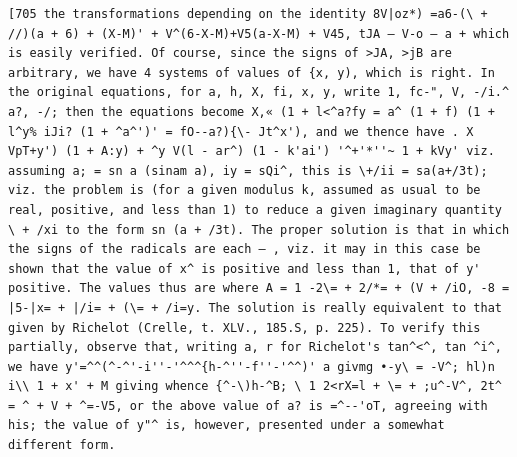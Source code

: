 \documentclass[11pt,a4paper]{book}
\begin{document}
\newpage
\setcounter{page}{584}
\begin{verbatim}
[705 the transformations depending on the identity 8V|oz*) =a6-(\ + //)(a + 6) + (X-M)' + V^(6-X-M)+V5(a-X-M) + V45, tJA — V-o — a + which is easily verified. Of course, since the signs of >JA, >jB are arbitrary, we have 4 systems of values of {x, y), which is right. In the original equations, for a, h, X, fi, x, y, write 1, fc-", V, -/i.^ a?, -/; then the equations become X,« (1 + l<^a?fy = a^ (1 + f) (1 + l^y% iJi? (1 + ^a^')' = fO--a?){\- Jt^x'), and we thence have . X VpT+y') (1 + A:y) + ^y V(l - ar^) (1 - k'ai') '^+'*''~ 1 + kVy' viz. assuming a; = sn a (sinam a), iy = sQi^, this is \+/ii = sa(a+/3t); viz. the problem is (for a given modulus k, assumed as usual to be real, positive, and less than 1) to reduce a given imaginary quantity \ + /xi to the form sn (a + /3t). The proper solution is that in which the signs of the radicals are each — , viz. it may in this case be shown that the value of x^ is positive and less than 1, that of y' positive. The values thus are where A = 1 -2\= + 2/*= + (V + /iO, -8 = |5-|x= + |/i= + (\= + /i=y. The solution is really equivalent to that given by Richelot (Crelle, t. XLV., 185.S, p. 225). To verify this partially, observe that, writing a, r for Richelot's tan^<^, tan ^i^, we have y'=^^(^-^'-i''-'^^^{h-^''-f''-'^^)' a givmg •-y\ = -V^; hl)n i\\ 1 + x' + M giving whence {^-\)h-^B; \ 1 2<rX=l + \= + ;u^-V^, 2t^ = ^ + V + ^=-V5, or the above value of a? is =^--'oT, agreeing with his; the value of y"^ is, however, presented under a somewhat different form. 
\end{verbatim}
\end{document}
